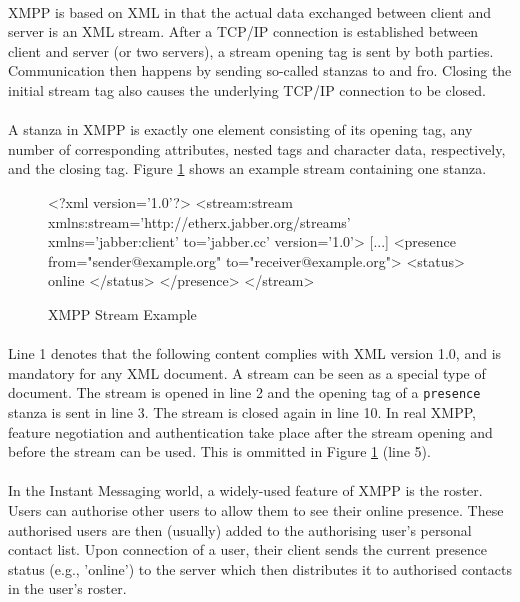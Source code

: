 \paragraph{}
XMPP is based on XML in that the actual data exchanged between client and server is an XML stream. After a TCP/IP connection is established between client and server (or two servers), a stream opening tag is sent by both parties. Communication then happens by sending so-called stanzas to and fro. Closing the initial stream tag also causes the underlying TCP/IP connection to be closed.
\paragraph{}
A stanza in XMPP is exactly one element consisting of its opening tag, any number of corresponding attributes, nested tags and character data, respectively, and the closing tag. Figure \ref{fig:streamExample} shows an example stream containing one stanza.

\begin{figure}[H]
\begin{listing}{1}
<?xml version='1.0'?>
<stream:stream 
      xmlns:stream='http://etherx.jabber.org/streams' 
      xmlns='jabber:client' to='jabber.cc' version='1.0'>
[...]
  <presence from="sender@example.org"
        to="receiver@example.org">
    <status>
      online
    </status>
  </presence>
</stream>
\end{listing}
\caption{XMPP Stream Example}
\label{fig:streamExample}
\end{figure}

\paragraph{}
Line 1 denotes that the following content complies with XML version 1.0, and is mandatory for any XML document. A stream can be seen as a special type of document. The stream is opened in line 2 and the opening tag of a \texttt{presence} stanza is sent in line 3. The stream is closed again in line 10. In real XMPP, feature negotiation and authentication take place after the stream opening and before the stream can be used. This is ommitted in Figure \ref{fig:streamExample} (line 5).
\paragraph{}
In the Instant Messaging world, a widely-used feature of XMPP is the roster. Users can authorise other users to allow them to see their online presence. These authorised users are then (usually) added to the authorising user's personal contact list. Upon connection of a user, their client sends the current presence status (e.g., 'online') to the server which then distributes it to authorised contacts in the user's roster.

